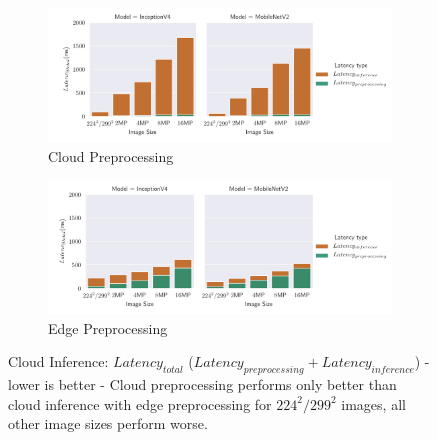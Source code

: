 \begin{figure}[!htb]
\centering
\begin{subfigure}[b]{0.95\textwidth}
   \includegraphics[width=1\linewidth]{./Bilder/single_plots/cloud_inference_plots/Cloud_Preprocessing_Inference_Comb_cloud_prepro.pdf}
   \caption{Cloud Preprocessing}
   \label{fig:CloudInference+PreproCloud} 
\end{subfigure}

\begin{subfigure}[b]{0.95\textwidth}
   \includegraphics[width=1\linewidth]{./Bilder/single_plots/cloud_inference_plots/Cloud_Preprocessing_Inference_Comb_edge_prepro.pdf}
   \caption{Edge Preprocessing}
   \label{fig:CloudInference+PreproEdge}
\end{subfigure}

\caption[Cloud Inference:  $Latency_{total}$  - lower is better]{Cloud Inference:  $Latency_{total}$ ($Latency_{preprocessing}+Latency_{inference}$) - lower is better - 
Cloud preprocessing performs only better than cloud inference with edge preprocessing for $224^2/299^2$ images, all other image sizes perform worse.}
\end{figure}

